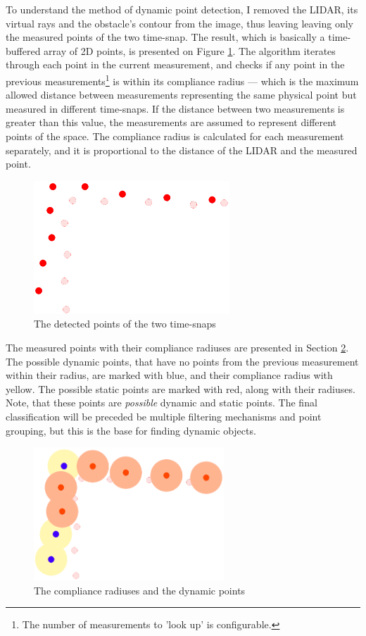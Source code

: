 To understand the method of dynamic point detection, I removed the LIDAR, its virtual rays and the obstacle's contour from the image, thus leaving leaving only the measured points of the two time-snap. The result, which is basically a time-buffered array of 2D points, is presented on Figure \ref{obstacle_movement_lidar_only}. The algorithm iterates through each point in the current measurement, and checks if any point in the previous measurements\footnote{The number of measurements to 'look up' is configurable.} is within its compliance radius --- which is the maximum allowed distance between measurements representing the same physical point but measured in different time-snaps. If the distance between two measurements is greater than this value, the measurements are assumed to represent different points of the space. The compliance radius is calculated for each measurement separately, and it is proportional to the distance of the LIDAR and the measured point.

\begin{figure}[!ht]
    \centering
    \includegraphics[height=50mm]{figures/raw/obstacle_movement_lidar_only.png}
    \caption{The detected points of the two time-snaps}
    \label{obstacle_movement_lidar_only}
\end{figure}

The measured points with their compliance radiuses are presented in Section \ref{compliance_radiuses}. The possible dynamic points, that have no points from the previous measurement within their radius, are marked with blue, and their compliance radius with yellow. The possible static points are marked with red, along with their radiuses. Note, that these points are \textit{possible} dynamic and static points. The final classification will be preceded be multiple filtering mechanisms and point grouping, but this is the base for finding dynamic objects.

\begin{figure}[!ht]
    \centering
    \includegraphics[height=50mm]{figures/raw/compliance_radiuses.png}
    \caption{The compliance radiuses and the dynamic points}
    \label{compliance_radiuses}
\end{figure}

